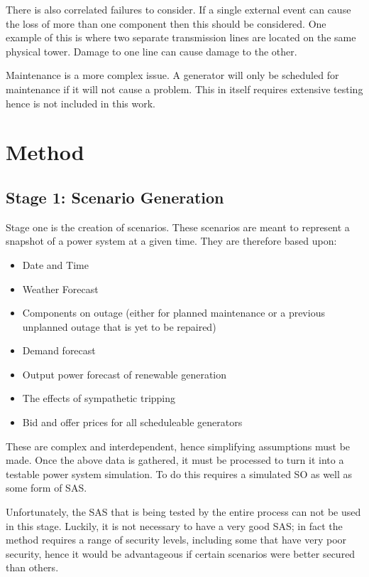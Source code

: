 \documentclass[a4paper,oneside,12pt]{report}
\begin{document}
There is also correlated failures to consider. If a single external event can cause the loss of more than one component then this should be considered. One example of this is where two separate transmission lines are located on the same physical tower. Damage to one line can cause damage to the other.

Maintenance is a more complex issue. A generator will only be scheduled for maintenance if it will not cause a problem. This in itself requires extensive testing hence is not included in this work.

\section{Method}
\subsection{Stage 1: Scenario Generation}

Stage one is the creation of scenarios. These scenarios are meant to represent a snapshot of a power system at a given time. They are therefore based upon:

\begin{itemize}
\item Date and Time
\item Weather Forecast
\item Components on outage (either for planned maintenance or a previous unplanned outage that is yet to be repaired)
\item Demand forecast
\item Output power forecast of renewable generation
\item The effects of sympathetic tripping
\item Bid and offer prices for all scheduleable generators
\end{itemize}

These are complex and interdependent, hence simplifying assumptions must be made. Once the above data is gathered, it must be processed to turn it into a testable power system simulation. To do this requires a simulated SO as well as some form of SAS.

Unfortunately, the SAS that is being tested by the entire process can not be used in this stage. Luckily, it is not necessary to have a very good SAS; in fact the method requires a range of security levels, including some that have very poor security, hence it would be advantageous if certain scenarios were better secured than others.
\end{document}
